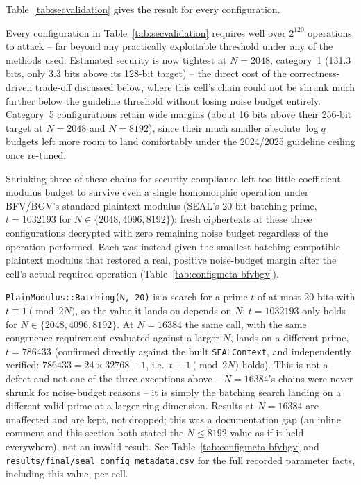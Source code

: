 Table~\ref{tab:secvalidation} gives the result for every configuration.

\begin{table}[h!]
\centering\small

\caption{Estimated security per configuration, in bits ($\log_2$ of the cheapest attack's cost). $\log_2 q$: SEAL's exact full modulus. The Gaussian column is the conventional model, the CBD(21) column SEAL's exact error distribution. Archived results: \texttt{experiments/security/results\_full\_N2048.csv}, \texttt{\_N4096.csv} and \texttt{\_N8192.csv}.}
\label{tab:secvalidation}
\end{table}

Every configuration in Table~\ref{tab:secvalidation} requires well over $2^{120}$ operations to attack -- far beyond any practically exploitable threshold under any of the methods used. Estimated security is now tightest at $N{=}2048$, category~1 (131.3 bits, only 3.3 bits above its 128-bit target) -- the direct cost of the correctness-driven trade-off discussed below, where this cell's chain could not be shrunk much further below the guideline threshold without losing noise budget entirely. Category~5 configurations retain wide margins (about 16 bits above their 256-bit target at $N{=}2048$ and $N{=}8192$), since their much smaller absolute $\log q$ budgets left more room to land comfortably under the 2024/2025 guideline ceiling once re-tuned.

Shrinking three of these chains for security compliance left too little coefficient-modulus budget to survive even a single homomorphic operation under BFV/BGV's standard plaintext modulus (SEAL's 20-bit batching prime, $t=1032193$ for $N \in \{2048, 4096, 8192\}$): fresh ciphertexts at these three configurations decrypted with zero remaining noise budget regardless of the operation performed. Each was instead given the smallest batching-compatible plaintext modulus that restored a real, positive noise-budget margin after the cell's actual required operation (Table~\ref{tab:configmeta-bfvbgv}).

\texttt{PlainModulus::Batching(N, 20)} is a search for a prime $t$ of at most 20 bits with $t \equiv 1 \pmod{2N}$, so the value it lands on depends on $N$: $t=1032193$ only holds for $N \in \{2048, 4096, 8192\}$. At $N=16384$ the same call, with the same congruence requirement evaluated against a larger $N$, lands on a different prime, $t=786433$ (confirmed directly against the built \texttt{SEALContext}, and independently verified: $786433 = 24 \times 32768 + 1$, i.e.\ $t \equiv 1 \pmod{2N}$ holds). This is not a defect and not one of the three exceptions above -- $N=16384$'s chains were never shrunk for noise-budget reasons -- it is simply the batching search landing on a different valid prime at a larger ring dimension. Results at $N=16384$ are unaffected and are kept, not dropped; this was a documentation gap (an inline comment and this section both stated the $N\le8192$ value as if it held everywhere), not an invalid result. See Table~\ref{tab:configmeta-bfvbgv} and \texttt{results/final/seal\_config\_metadata.csv} for the full recorded parameter facts, including this value, per cell.

